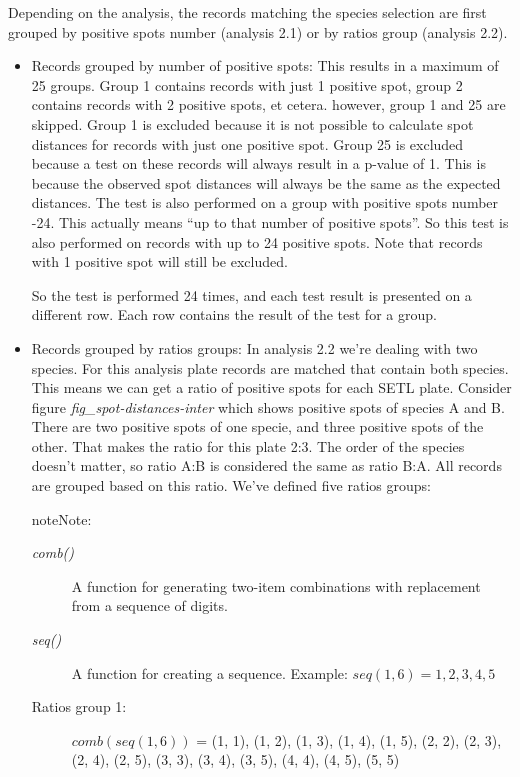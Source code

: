 \documentclass[letterpaper,10pt,english]{sphinxmanual}
\begin{document}
Depending on the analysis, the records matching the species selection
are first grouped by positive spots number (analysis 2.1) or by ratios
group (analysis 2.2).
\begin{itemize}
\item {} 
Records grouped by number of positive spots: This results in a
maximum of 25 groups. Group 1 contains records with just 1 positive
spot, group 2 contains records with 2 positive spots, et cetera.
however, group 1 and 25 are skipped. Group 1 is excluded because it
is not possible to calculate spot distances for records with just one
positive spot. Group 25 is excluded because a test on these records
will always result in a p-value of 1. This is because the observed
spot distances will always be the same as the expected distances.
The test is also performed on a group with positive spots number -24.
This actually means ``up to that number of positive spots''. So this
test is also performed on records with up to 24 positive spots. Note
that records with 1 positive spot will still be excluded.

So the test is performed 24 times, and each test result is presented on
a different row. Each row contains the result of the test for a group.

\item {} 
Records grouped by ratios groups: In analysis 2.2 we're dealing with
two species. For this analysis plate records are matched that contain
both species. This means we can get a ratio of positive spots for each
SETL plate.
Consider figure \emph{fig\_spot-distances-inter} which shows positive
spots of species A and B. There are two positive spots of one specie,
and three positive spots of the other. That makes the ratio for this
plate 2:3. The order of the species doesn't matter, so ratio A:B is
considered the same as ratio B:A. All records are grouped based on
this ratio. We've defined five ratios groups:

\begin{notice}{note}{Note:}\begin{description}
\item[{\emph{comb()}}] \leavevmode
A function for generating two-item combinations with replacement
from a sequence of digits.

\item[{\emph{seq()}}] \leavevmode
A function for creating a sequence. Example:
$seq(1,6) = 1,2,3,4,5$

\end{description}
\end{notice}
\begin{description}
\item[{Ratios group 1:}] \leavevmode
$comb(seq(1,6))$ =
(1, 1), (1, 2), (1, 3), (1, 4), (1, 5), (2, 2), (2, 3), (2, 4),
(2, 5), (3, 3), (3, 4), (3, 5), (4, 4), (4, 5), (5, 5)


\end{description}
\end{itemize}
\end{document}
